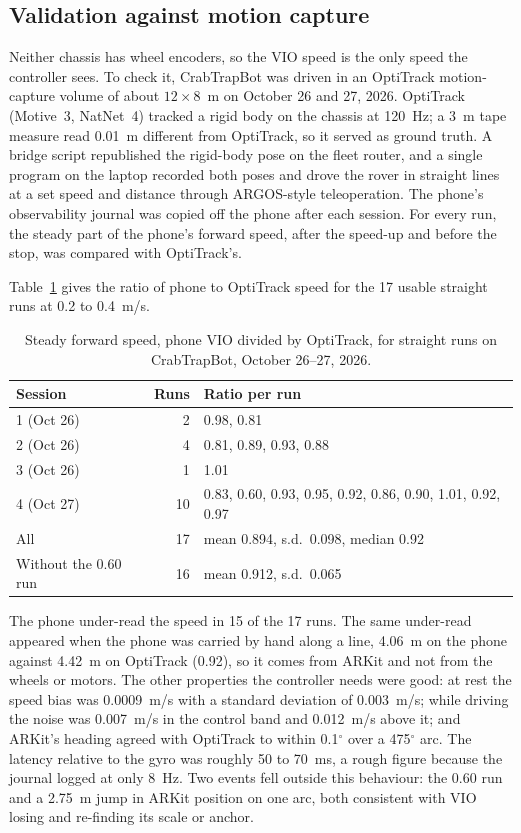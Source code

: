 \subsection{Validation against motion capture}
\label{sec:auto-state-validation}

Neither chassis has wheel encoders, so the VIO speed is the only speed the controller sees.
To check it, CrabTrapBot was driven in an OptiTrack motion-capture volume of about $12 \times 8$~m on October 26 and 27, 2026.
OptiTrack (Motive~3, NatNet~4) tracked a rigid body on the chassis at 120~Hz; a 3~m tape measure read 0.01~m different from OptiTrack, so it served as ground truth.
A bridge script republished the rigid-body pose on the fleet router, and a single program on the laptop recorded both poses and drove the rover in straight lines at a set speed and distance through ARGOS-style teleoperation.
The phone's observability journal was copied off the phone after each session.
For every run, the steady part of the phone's forward speed, after the speed-up and before the stop, was compared with OptiTrack's.

Table~\ref{tab:vio-scale} gives the ratio of phone to OptiTrack speed for the 17 usable straight runs at 0.2 to 0.4~m/s.

\begin{table}[ht]
\centering
\caption{Steady forward speed, phone VIO divided by OptiTrack, for straight runs on CrabTrapBot, October 26--27, 2026.}
\label{tab:vio-scale}
\begin{tabular}{@{}l r l@{}}
\toprule
Session & Runs & Ratio per run \\
\midrule
1 (Oct 26) & 2 & 0.98, 0.81 \\
2 (Oct 26) & 4 & 0.81, 0.89, 0.93, 0.88 \\
3 (Oct 26) & 1 & 1.01 \\
4 (Oct 27) & 10 & 0.83, 0.60, 0.93, 0.95, 0.92, 0.86, 0.90, 1.01, 0.92, 0.97 \\
\midrule
All & 17 & mean 0.894, s.d.\ 0.098, median 0.92 \\
Without the 0.60 run & 16 & mean 0.912, s.d.\ 0.065 \\
\bottomrule
\end{tabular}
\end{table}

The phone under-read the speed in 15 of the 17 runs.
The same under-read appeared when the phone was carried by hand along a line, 4.06~m on the phone against 4.42~m on OptiTrack (0.92), so it comes from ARKit and not from the wheels or motors.
The other properties the controller needs were good: at rest the speed bias was 0.0009~m/s with a standard deviation of 0.003~m/s; while driving the noise was 0.007~m/s in the control band and 0.012~m/s above it; and ARKit's heading agreed with OptiTrack to within 0.1$^\circ$ over a 475$^\circ$ arc.
The latency relative to the gyro was roughly 50 to 70~ms, a rough figure because the journal logged at only 8~Hz.
Two events fell outside this behaviour: the 0.60 run and a 2.75~m jump in ARKit position on one arc, both consistent with VIO losing and re-finding its scale or anchor.

